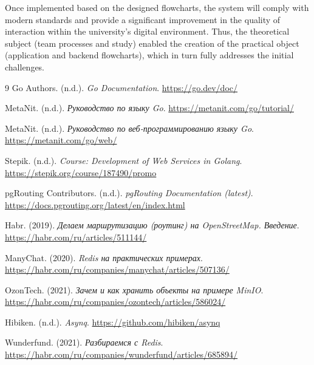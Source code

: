 \documentclass[a4paper, 14pt]{extreport}
\begin{document}
Once implemented based on the designed flowcharts, the system will comply with modern standards and provide a significant improvement in the quality of interaction within the university's digital environment. Thus, the theoretical subject (team processes and study) enabled the creation of the practical object (application and backend flowcharts), which in turn fully addresses the initial challenges.
\begin{thebibliography}{9}
 Go Authors. (n.d.). \textit{Go Documentation}. \url{https://go.dev/doc/}

 MetaNit. (n.d.). \textit{Руководство по языку Go}. \url{https://metanit.com/go/tutorial/}

 MetaNit. (n.d.). \textit{Руководство по веб-программированию языку Go}. \url{https://metanit.com/go/web/}

 Stepik. (n.d.). \textit{Course: Development of Web Services in Golang}. \url{https://stepik.org/course/187490/promo}

 pgRouting Contributors. (n.d.). \textit{pgRouting Documentation (latest)}. \url{https://docs.pgrouting.org/latest/en/index.html}

 Habr. (2019). \textit{Делаем маршрутизацию (роутинг) на OpenStreetMap. Введение}. \url{https://habr.com/ru/articles/511144/}

 ManyChat. (2020). \textit{Redis на практических примерах}. \url{https://habr.com/ru/companies/manychat/articles/507136/}

 OzonTech. (2021). \textit{Зачем и как хранить объекты на примере MinIO}. \url{https://habr.com/ru/companies/ozontech/articles/586024/}

 Hibiken. (n.d.). \textit{Asynq}. \url{https://github.com/hibiken/asynq}

 Wunderfund. (2021). \textit{Разбираемся с Redis}. \url{https://habr.com/ru/companies/wunderfund/articles/685894/}

\end{thebibliography}
\end{document}
